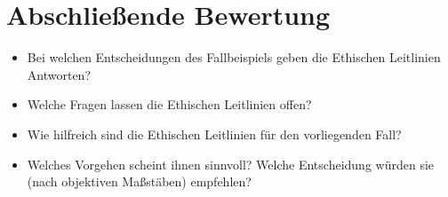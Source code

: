 \documentclass[10pt, a5paper]{arbeitsblatt}
\begin{document}
\section{Abschließende Bewertung}
\begin{itemize}
	\item Bei welchen Entscheidungen des Fallbeispiels geben die Ethischen Leitlinien Antworten?
	\item Welche Fragen lassen die Ethischen Leitlinien offen?
	\item Wie hilfreich sind die Ethischen Leitlinien für den vorliegenden Fall?
	\item Welches Vorgehen scheint ihnen sinnvoll? Welche Entscheidung würden sie (nach objektiven Maßstäben) empfehlen?
\end{itemize}
\end{document}
